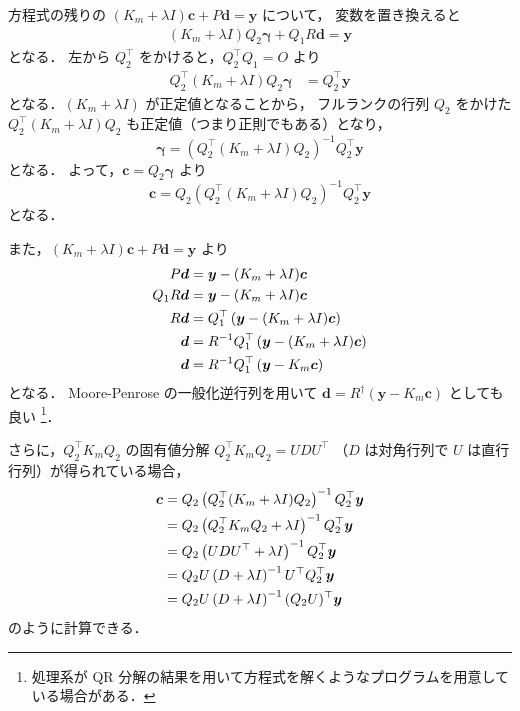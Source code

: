 方程式の残りの $(K_m + \lambda I) \bm{c} + P \bm{d} = \bm{y}$ について，
変数を置き換えると
\begin{align}
    (K_m + \lambda I) Q_2 \bm{\gamma} + Q_1 R \bm{d} = \bm{y}
\end{align}
となる．
左から $Q_2^\top$ をかけると，$Q_2^\top Q_1 = O$ より
\begin{align}
    Q_2^\top (K_m + \lambda I) Q_2 \bm{\gamma} & = Q_2^\top \bm{y}
\end{align}
となる．$(K_m + \lambda I)$ が正定値となることから，
フルランクの行列 $Q_2$ をかけた $Q_2^\top (K_m + \lambda I) Q_2$ も正定値（つまり正則でもある）となり，
\begin{equation}
    \bm{\gamma} = \left( Q_2^\top (K_m + \lambda I) Q_2 \right)^{-1} Q_2^\top \bm{y}
\end{equation}
となる．
よって，$\bm{c} = Q_2 \bm{\gamma}$ より
\begin{equation}
    \bm{c} = Q_2 \left( Q_2^\top (K_m + \lambda I) Q_2 \right)^{-1} Q_2^\top \bm{y}
\end{equation}
となる．

また，$(K_m + \lambda I) \bm{c} + P \bm{d} = \bm{y}$ より
\begin{align}
    P \bm{d}     & = \bm{y} - (K_m + \lambda I) \bm{c} \notag                                \\
    Q_1 R \bm{d} & = \bm{y} - (K_m + \lambda I) \bm{c} \notag                                \\
    R \bm{d}     & = Q_1^\top \left( \bm{y} - (K_m + \lambda I) \bm{c} \right) \notag        \\
    \bm{d}       & = R^{-1} Q_1^\top \left( \bm{y} - (K_m + \lambda I) \bm{c} \right) \notag \\
    \bm{d}       & = R^{-1} Q_1^\top \left( \bm{y} - K_m \bm{c} \right)
\end{align}
となる．
Moore-Penrose の一般化逆行列を用いて
$\bm{d} = R^\dagger \left( \bm{y} - K_m \bm{c} \right)$
としても良い
\footnote{処理系が QR 分解の結果を用いて方程式を解くようなプログラムを用意している場合がある．}．

さらに，$Q_2^\top K_m Q_2$ の固有値分解
$Q_2^\top K_m Q_2 = U D U^\top$ （$D$ は対角行列で $U$ は直行行列）が得られている場合，
\begin{align}
    \bm{c}
     & = Q_2 \left( Q_2^\top (K_m + \lambda I) Q_2 \right)^{-1} Q_2^\top \bm{y}
    \notag                                                                      \\
     & = Q_2 \left( Q_2^\top K_m Q_2 + \lambda I \right)^{-1} Q_2^\top \bm{y}
    \notag                                                                      \\
     & = Q_2 \left( U D U^\top + \lambda I \right)^{-1} Q_2^\top \bm{y}
    \notag                                                                      \\
     & = Q_2 U \left( D + \lambda I \right)^{-1} U^\top Q_2^\top \bm{y}
    \notag                                                                      \\
     & = Q_2 U \left( D + \lambda I \right)^{-1} (Q_2 U)^\top \bm{y}
\end{align}
のように計算できる．


